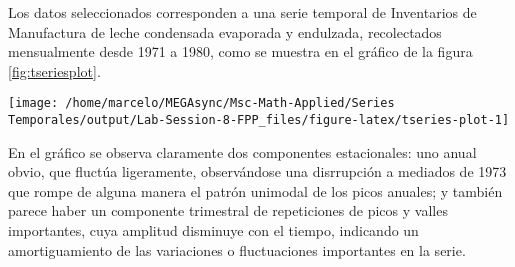 \documentclass[]{article}
\newenvironment{Shaded}{\begin{snugshade}}{\end{snugshade}}
\newcommand{\CommentTok}[1]{\textcolor[rgb]{0.56,0.35,0.01}{\textit{#1}}}
\newcommand{\DataTypeTok}[1]{\textcolor[rgb]{0.13,0.29,0.53}{#1}}
\newcommand{\DecValTok}[1]{\textcolor[rgb]{0.00,0.00,0.81}{#1}}
\newcommand{\KeywordTok}[1]{\textcolor[rgb]{0.13,0.29,0.53}{\textbf{#1}}}
\newcommand{\NormalTok}[1]{#1}
\newcommand{\OperatorTok}[1]{\textcolor[rgb]{0.81,0.36,0.00}{\textbf{#1}}}
\newcommand{\OtherTok}[1]{\textcolor[rgb]{0.56,0.35,0.01}{#1}}
\newcommand{\StringTok}[1]{\textcolor[rgb]{0.31,0.60,0.02}{#1}}
\begin{document}
Los datos seleccionados corresponden a una serie temporal de Inventarios de Manufactura de leche condensada evaporada y endulzada, recolectados mensualmente desde 1971 a 1980, como se muestra en el gráfico de la figura \ref{fig:tseriesplot}.

\begin{Shaded}
\end{Shaded}

\begin{center}\texttt{[image: /home/marcelo/MEGAsync/Msc-Math-Applied/Series Temporales/output/Lab-Session-8-FPP\_files/figure-latex/tseries-plot-1]} \end{center}

En el gráfico se observa claramente dos componentes estacionales: uno anual obvio, que fluctúa ligeramente, observándose una disrrupción a mediados de 1973 que rompe de alguna manera el patrón unimodal de los picos anuales; y también parece haber un componente trimestral de repeticiones de picos y valles importantes, cuya amplitud disminuye con el tiempo, indicando un amortiguamiento de las variaciones o fluctuaciones importantes en la serie.
\end{document}
